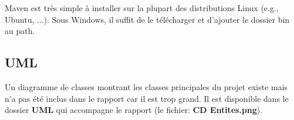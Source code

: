 Maven est très simple à installer sur la plupart des distributions Linux (e.g., Ubuntu, ...). Sous Windows, il suffit de le télécharger et d'ajouter le dossier bin au path.



\subsection{UML}
Un diagramme de classes montrant les classes principales du projet existe mais n'a pas été inclus dans le rapport car il est trop grand. Il est disponible dans le dossier \textbf{UML} qui accompagne le rapport (le fichier: \textbf{CD Entites.png}).